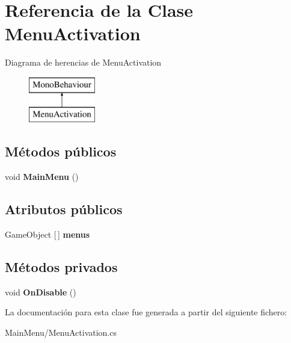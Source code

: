 \hypertarget{class_menu_activation}{}\section{Referencia de la Clase Menu\+Activation}
\label{class_menu_activation}
Diagrama de herencias de Menu\+Activation\begin{figure}[H]
\begin{center}
\leavevmode
\includegraphics[height=2.000000cm]{class_menu_activation}
\end{center}
\end{figure}
\subsection*{Métodos públicos}
\begin{DoxyCompactItemize}
\item 
\mbox{\label{class_menu_activation_a33c2996911d4edd216846a868c94ab72}} 
void {\bfseries Main\+Menu} ()
\end{DoxyCompactItemize}
\subsection*{Atributos públicos}
\begin{DoxyCompactItemize}
\item 
\mbox{\label{class_menu_activation_a2fafee3893d91c1f926282e7d92b3b92}} 
Game\+Object \mbox{[}$\,$\mbox{]} {\bfseries menus}
\end{DoxyCompactItemize}
\subsection*{Métodos privados}
\begin{DoxyCompactItemize}
\item 
\mbox{\label{class_menu_activation_a0f0894f5eb8c76a8a0129ae1e822d451}} 
void {\bfseries On\+Disable} ()
\end{DoxyCompactItemize}


La documentación para esta clase fue generada a partir del siguiente fichero\+:\begin{DoxyCompactItemize}
\item 
Main\+Menu/Menu\+Activation.\+cs\end{DoxyCompactItemize}
